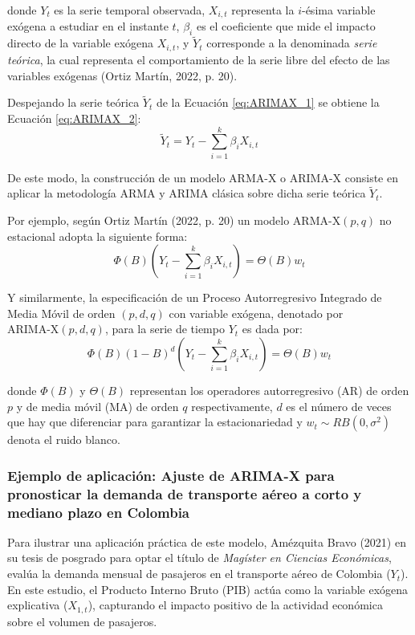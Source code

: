 \documentclass[11pt,letterpaper]{article}
\begin{document}
donde $Y_t$ es la serie temporal observada, $X_{i,t}$ representa la $i$-ésima variable exógena a estudiar en el instante $t$, $\beta_i$ es el coeficiente que mide el impacto directo de la variable exógena $X_{i,t}$, y $\tilde{Y}_t$ corresponde a la denominada \textit{serie teórica}, la cual representa el comportamiento de la serie libre del efecto de las variables exógenas (Ortiz Martín, 2022, p. 20).

Despejando la serie teórica $\tilde{Y}_t$ de la Ecuación \ref{eq:ARIMAX_1} se obtiene la Ecuación \ref{eq:ARIMAX_2}:
\begin{equation}
\tilde{Y}_t = Y_t - \sum_{i=1}^k \beta_i X_{i,t}
\label{eq:ARIMAX_2}
\end{equation}

De este modo, la construcción de un modelo ARMA-X o ARIMA-X consiste en aplicar la metodología ARMA y ARIMA clásica sobre dicha serie teórica $\tilde{Y}_t$. 

Por ejemplo, según Ortiz Martín (2022, p. 20) un modelo $\text{ARMA-X}(p, q)$ no estacional adopta la siguiente forma:
\begin{equation}
\Phi(B) \left( Y_t - \sum_{i=1}^k \beta_i X_{i,t} \right) = \Theta(B) w_t
\label{eq:ARMAX_def}
\end{equation}

Y similarmente, la especificación de un Proceso Autorregresivo Integrado de Media Móvil de orden $(p, d, q)$ con variable exógena, denotado por $\text{ARIMA-X}(p,d,q)$, para la serie de tiempo $Y_t$ es dada por:
\begin{equation}
\Phi(B) (1-B)^d \left( Y_t - \sum_{i=1}^k \beta_i X_{i,t} \right) = \Theta(B) w_t
\label{eq:ARIMAX_def}
\end{equation}

donde $\Phi(B)$ y $\Theta(B)$ representan los operadores autorregresivo (AR) de orden $p$ y de media móvil (MA) de orden $q$ respectivamente, $d$ es el número de veces que hay que diferenciar para garantizar la estacionariedad y $w_t \sim RB(0, \sigma^2)$ denota el ruido blanco.


\subsubsection{Ejemplo de aplicación: Ajuste de ARIMA-X para pronosticar la demanda de transporte aéreo a corto y mediano plazo en Colombia} 
Para ilustrar una aplicación práctica de este modelo, Amézquita Bravo (2021) en su tesis de posgrado para optar el título de \textit{Magíster en Ciencias Económicas}, evalúa la demanda mensual de pasajeros en el transporte aéreo de Colombia ($Y_t$). En este estudio, el Producto Interno Bruto (PIB) actúa como la variable exógena explicativa ($X_{1,t}$), capturando el impacto positivo de la actividad económica sobre el volumen de pasajeros.
\end{document}
